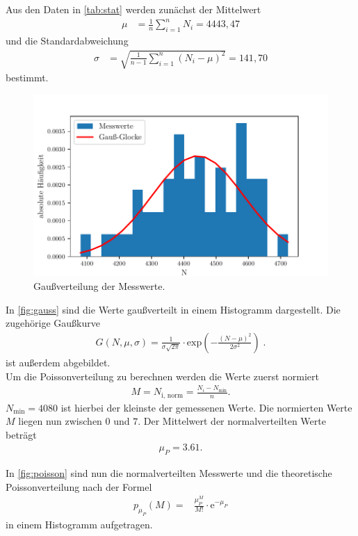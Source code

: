 Aus den Daten in \autoref{tab:stat} werden zunächst der Mittelwert
\begin{align*}
  \mu &= \frac{1}{n} \sum_{i=1}^n N_i = 4443,47
\end{align*}
und die Standardabweichung
\begin{align*}
 \sigma &= \sqrt{ \frac{1}{n-1} \sum_{i=1}^n (N_i - \mu)^2  } =141,70 
\end{align*}
bestimmt.

\begin{figure}[H]
  \centering
  \includegraphics[width=\textwidth]{build/gauss.pdf}
  \caption {Gaußverteilung der Messwerte.}
  \label{fig:gauss}
\end{figure}

In \autoref{fig:gauss} sind die Werte gaußverteilt in einem Histogramm dargestellt. Die zugehörige Gaußkurve
\begin{align*}
  G(N, \mu, \sigma) = \frac{1}{\sigma \sqrt{2 \pi}} \cdot \text{exp} \left(- \frac{(N - \mu)^2}{2 \sigma^2} \right) \; .
\end{align*}
ist außerdem abgebildet.\\

Um die Poissonverteilung zu berechnen werden die Werte zuerst normiert
\begin{align*}
  M=N_\text{i, norm} = \frac{N_i - N_\text{min}}{n}.
\end{align*}
$N_\text{min}= 4080$ ist hierbei der kleinste der gemessenen Werte.
Die normierten Werte $M$ liegen nun zwischen $0$ und $7$.
Der Mittelwert der normalverteilten Werte beträgt
\begin{align*}
  \mu_P= 3.61.
\end{align*}

In \autoref{fig:poisson} sind nun die normalverteilten Messwerte und die theoretische Poissonverteilung nach der Formel
\begin{align*}
  p_{\mu_P}(M) =& \frac{\mu_P^M}{M!} \cdot \text{e}^{-\mu_P} 
\end{align*}
in einem Histogramm aufgetragen.


